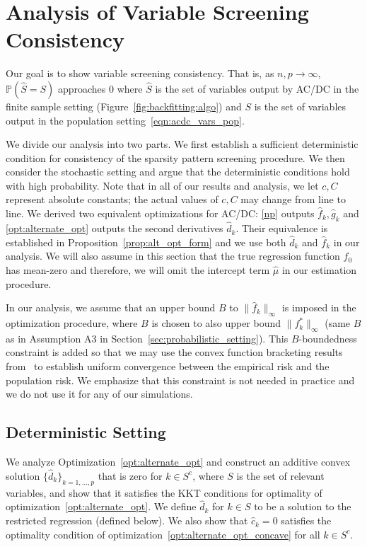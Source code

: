 \section{Analysis of Variable Screening Consistency}
\label{sec:finitesample}

Our goal is to show variable screening consistency. That is, as
$n,p \rightarrow \infty$, $\mathbb{P}( \hat{S} = S)$ approaches 0
where $\hat{S}$ is the set of variables output by AC/DC in the
finite sample setting (Figure~\ref{fig:backfitting:algo}) and $S$ is
the set of variables output in the population
setting~\eqref{eqn:acdc_vars_pop}.

We divide our analysis into two parts. We first establish a sufficient
deterministic condition for consistency of the sparsity pattern
screening procedure.  We then consider the stochastic setting and
argue that the deterministic conditions hold with high
probability. Note that in all of our results and analysis, we let $c,
C$ represent absolute constants; the actual values of $c,C$ may change
from line to line. We derived two equivalent optimizations for AC/DC:
\eqref{np} outputs $\hat{f}_k, \hat{g}_k$ and
\eqref{opt:alternate_opt} outputs the second derivatives
$\hat{d}_k$. Their equivalence is established in
Proposition~\ref{prop:alt_opt_form} and we use both $\hat{d}_k$ and
$\hat{f}_k$ in our analysis. We will also assume in this section that
the true regression function $f_0$ has mean-zero and therefore, we
will omit the intercept term $\hat{\mu}$ in our estimation
procedure.

In our analysis, we assume that an upper bound $B$ to $\| \hat{f}_k
\|_\infty$ is imposed in the optimization procedure, where $B$ is
chosen to also upper bound $\| f^*_k \|_\infty$ (same $B$ as in
Assumption A3 in Section~\ref{sec:probabilistic_setting}). This
$B$-boundedness constraint is added so that we may use the convex
function bracketing results from~\cite{kim2014global} to establish
uniform convergence between the empirical risk and the population
risk. We emphasize that this constraint is not needed in practice and
we do not use it for any of our simulations.


\subsection{Deterministic Setting}

We analyze Optimization~\ref{opt:alternate_opt} and construct an additive convex solution $\{\hat{d}_k\}_{k=1,\ldots,p}$
that is zero for $k \in S^c$, where $S$ is the set of relevant
variables, and show that it satisfies the KKT
conditions for optimality of optimization~\eqref{opt:alternate_opt}. We
define $\hat{d}_k$ for $k \in S$ to be a solution to the restricted
regression (defined below). We also show that $\hat{c}_k =
0$ satisfies the optimality condition of
optimization~\eqref{opt:alternate_opt_concave} for all $k \in S^c$.

